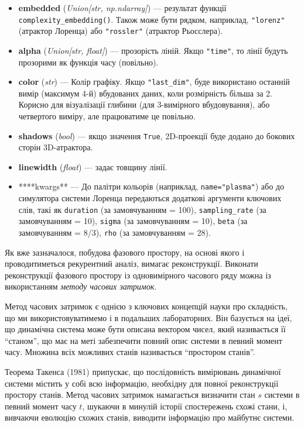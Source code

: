 \documentclass[
  letterpaper,
]{report}
\providecommand{\tightlist}{%
  \setlength{\itemsep}{0pt}\setlength{\parskip}{0pt}}\usepackage{longtable,booktabs,array}
\begin{document}
\begin{itemize}
\tightlist
\item
  \textbf{embedded} (\emph{Union{[}str, np.ndarray{]}}) --- результат
  функції \texttt{complexity\_embedding()}. Також може бути рядком,
  наприклад, \texttt{"lorenz"} (атрактор Лоренца) або \texttt{"rossler"}
  (атрактор Рьосслера).
\item
  \textbf{alpha} (\emph{Union{[}str, float{]}}) --- прозорість ліній.
  Якщо \texttt{"time"}, то лінії будуть прозорими як функція часу
  (повільно).
\item
  \textbf{color} (\emph{str}) --- Колір графіку. Якщо
  \texttt{"last\_dim"}, буде використано останній вимір (максимум 4-й)
  вбудованих даних, коли розмірність більша за 2. Корисно для
  візуалізації глибини (для 3-вимірного вбудовування), або четвертого
  виміру, але працюватиме це повільно.
\item
  \textbf{shadows} (\emph{bool}) --- якщо значення \texttt{True},
  2D-проекції буде додано до бокових сторін 3D-атрактора.
\item
  \textbf{linewidth} (\emph{float}) --- задає товщину лінії.
\item
  ****kwargs** --- До палітри кольорів (наприклад,
  \texttt{name="plasma"}) або до симулятора системи Лоренца передаються
  додаткові аргументи ключових слів, такі як \texttt{duration} (за
  замовчуванням = 100), \texttt{sampling\_rate} (за замовчуванням = 10),
  \texttt{sigma} (за замовчуванням = 10), \texttt{beta} (за
  замовчуванням = 8/3), \texttt{rho} (за замовчуванням = 28).
\end{itemize}

Як вже зазначалося, побудова фазового простору, на основі якого і
проводитиметься рекурентний аналіз, вимагає реконструкції. Виконати
реконструкції фазового простору із одновимірного часового ряду можна із
використанням \emph{методу часових затримок}.

Метод часових затримок є однією з ключових концепцій науки про
складність, що ми використовуватимемо і в подальших лабораторних. Він
базується на ідеї, що динамічна система може бути описана вектором
чисел, який називається її ``станом'', що має на меті забезпечити повний
опис системи в певний момент часу. Множина всіх можливих станів
називається ``простором станів''.

Теорема Такенса (1981) припускає, що послідовність вимірювань динамічної
системи містить у собі всю інформацію, необхідну для повної
реконструкції простору станів. Метод часових затримок намагається
визначити стан \(s\) системи в певний момент часу \(t\), шукаючи в
минулій історії спостережень схожі стани, і, вивчаючи еволюцію схожих
станів, виводити інформацію про майбутнє системи.
\end{document}
